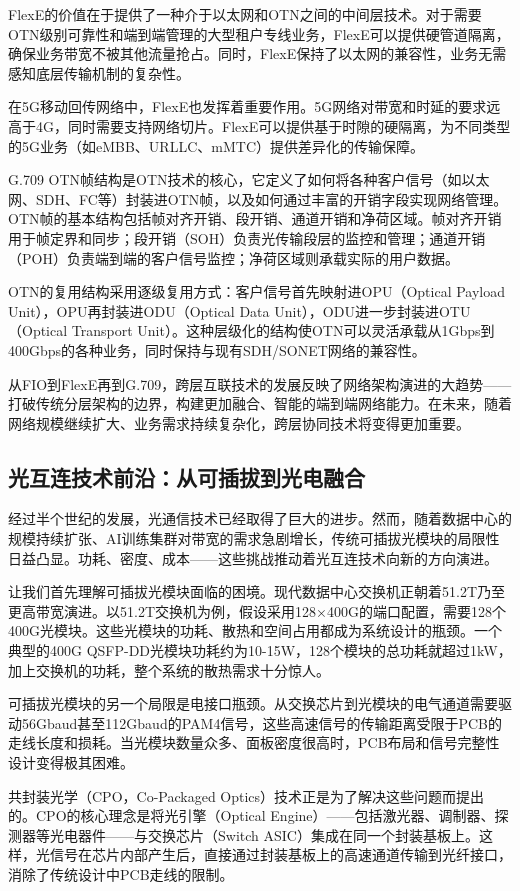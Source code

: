 FlexE的价值在于提供了一种介于以太网和OTN之间的中间层技术。对于需要OTN级别可靠性和端到端管理的大型租户专线业务，FlexE可以提供硬管道隔离，确保业务带宽不被其他流量抢占。同时，FlexE保持了以太网的兼容性，业务无需感知底层传输机制的复杂性。

在5G移动回传网络中，FlexE也发挥着重要作用。5G网络对带宽和时延的要求远高于4G，同时需要支持网络切片。FlexE可以提供基于时隙的硬隔离，为不同类型的5G业务（如eMBB、URLLC、mMTC）提供差异化的传输保障。

G.709 OTN帧结构是OTN技术的核心，它定义了如何将各种客户信号（如以太网、SDH、FC等）封装进OTN帧，以及如何通过丰富的开销字段实现网络管理。OTN帧的基本结构包括帧对齐开销、段开销、通道开销和净荷区域。帧对齐开销用于帧定界和同步；段开销（SOH）负责光传输段层的监控和管理；通道开销（POH）负责端到端的客户信号监控；净荷区域则承载实际的用户数据。

OTN的复用结构采用逐级复用方式：客户信号首先映射进OPU（Optical Payload Unit），OPU再封装进ODU（Optical Data Unit），ODU进一步封装进OTU（Optical Transport Unit）。这种层级化的结构使OTN可以灵活承载从1Gbps到400Gbps的各种业务，同时保持与现有SDH/SONET网络的兼容性。

从FIO到FlexE再到G.709，跨层互联技术的发展反映了网络架构演进的大趋势——打破传统分层架构的边界，构建更加融合、智能的端到端网络能力。在未来，随着网络规模继续扩大、业务需求持续复杂化，跨层协同技术将变得更加重要。

\subsection{光互连技术前沿：从可插拔到光电融合}

经过半个世纪的发展，光通信技术已经取得了巨大的进步。然而，随着数据中心的规模持续扩张、AI训练集群对带宽的需求急剧增长，传统可插拔光模块的局限性日益凸显。功耗、密度、成本——这些挑战推动着光互连技术向新的方向演进。

让我们首先理解可插拔光模块面临的困境。现代数据中心交换机正朝着51.2T乃至更高带宽演进。以51.2T交换机为例，假设采用128×400G的端口配置，需要128个400G光模块。这些光模块的功耗、散热和空间占用都成为系统设计的瓶颈。一个典型的400G QSFP-DD光模块功耗约为10-15W，128个模块的总功耗就超过1kW，加上交换机的功耗，整个系统的散热需求十分惊人。

可插拔光模块的另一个局限是电接口瓶颈。从交换芯片到光模块的电气通道需要驱动56Gbaud甚至112Gbaud的PAM4信号，这些高速信号的传输距离受限于PCB的走线长度和损耗。当光模块数量众多、面板密度很高时，PCB布局和信号完整性设计变得极其困难。

共封装光学（CPO，Co-Packaged Optics）技术正是为了解决这些问题而提出的。CPO的核心理念是将光引擎（Optical Engine）——包括激光器、调制器、探测器等光电器件——与交换芯片（Switch ASIC）集成在同一个封装基板上。这样，光信号在芯片内部产生后，直接通过封装基板上的高速通道传输到光纤接口，消除了传统设计中PCB走线的限制。

